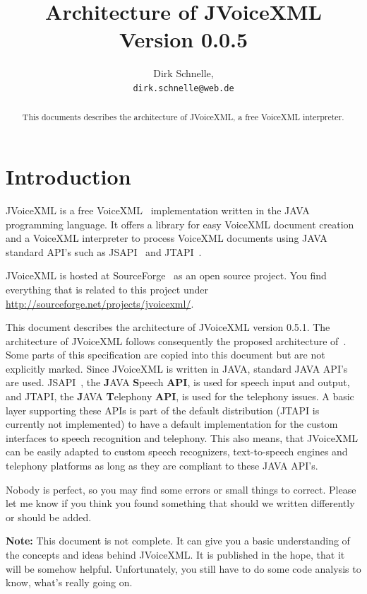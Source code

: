 \documentclass[11pt,a4paper]{article}
\title{Architecture of JVoiceXML \\
Version 0.0.5}
\author{Dirk Schnelle,  \\
  \texttt{dirk.schnelle@web.de} }
\date{}
\begin{document}
\pagestyle{headings}

\maketitle

\begin{abstract}
This documents describes the architecture of JVoiceXML, a free
VoiceXML interpreter.
\end{abstract}

\tableofcontents

\section{Introduction}
\label{sec:introduction}

JVoiceXML is a free VoiceXML~\cite{w3.org:voicexml} implementation written in 
the JAVA programming language. It offers a library for easy VoiceXML
document creation and a VoiceXML interpreter to process 
VoiceXML documents using JAVA standard API's such as JSAPI~\cite{sun:jsapi} and
JTAPI~\cite{sun:jsapi}.

JVoiceXML is hosted at SourceForge~\cite{sourceforge} as an open source 
project.
You find everything that is related to this project under
\url{http://sourceforge.net/projects/jvoicexml/}.

This document describes the architecture of JVoiceXML version 0.5.1. The
architecture of JVoiceXML follows
consequently the proposed architecture of~\cite{w3.org:voicexml}.
Some parts of this specification are copied into this document
but are not explicitly marked.
Since JVoiceXML is written in JAVA, standard JAVA API's are used.
JSAPI~\cite{sun:jsapi}, the \textbf{J}AVA \textbf{S}peech \textbf{API},
is used for speech input and output,
and JTAPI, the \textbf{J}AVA \textbf{T}elephony \textbf{API}, is used for the 
telephony issues. 
A basic layer supporting these APIs is part of the default distribution (JTAPI
is currently not implemented) to have a default implementation for the custom
interfaces to speech recognition and telephony. This
also means, that JVoiceXML can be easily adapted to custom speech recognizers,
text-to-speech engines and telephony platforms as long as they
are compliant to these JAVA API's.

Nobody is perfect, so you may find some errors or small things to correct.
Please let me know if you think you found something that should we written
differently or should be added.

\textbf{Note: } This document is not complete. It can give you a basic
understanding of the concepts and ideas behind JVoiceXML. It is
published in the hope, that it will be somehow helpful.
Unfortunately, you still have to do some code analysis to know, what's
really going on.
\end{document}
